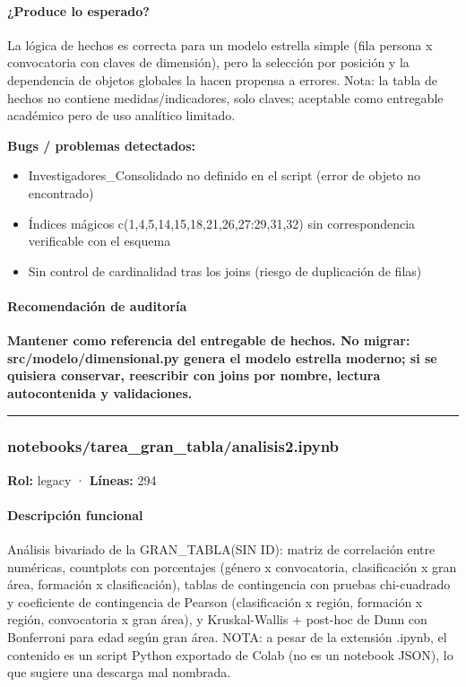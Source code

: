 \paragraph{¿Produce lo esperado?}
La lógica de hechos es correcta para un modelo estrella simple (fila persona x convocatoria con claves de dimensión), pero la selección por posición y la dependencia de objetos globales la hacen propensa a errores. Nota: la tabla de hechos no contiene medidas/indicadores, solo claves; aceptable como entregable académico pero de uso analítico limitado.

\begin{tcolorbox}[riesgo]
\textbf{Bugs / problemas detectados:}
\begin{itemize}
  \item Investigadores\_Consolidado no definido en el script (error de objeto no encontrado)
  \item Índices mágicos c(1,4,5,14,15,18,21,26,27:29,31,32) sin correspondencia verificable con el esquema
  \item Sin control de cardinalidad tras los joins (riesgo de duplicación de filas)
\end{itemize}
\end{tcolorbox}

\paragraph{Recomendación de auditoría}
\textbf{Mantener como referencia del entregable de hechos. No migrar: src/modelo/dimensional.py genera el modelo estrella moderno; si se quisiera conservar, reescribir con joins por nombre, lectura autocontenida y validaciones.}

\medskip
\hrule

\subsubsection{notebooks/tarea\_gran\_tabla/analisis2.ipynb}
\textbf{Rol:} legacy · \textbf{Líneas:} 294

\paragraph{Descripción funcional}
Análisis bivariado de la GRAN\_TABLA(SIN ID): matriz de correlación entre numéricas, countplots con porcentajes (género x convocatoria, clasificación x gran área, formación x clasificación), tablas de contingencia con pruebas chi-cuadrado y coeficiente de contingencia de Pearson (clasificación x región, formación x región, convocatoria x gran área), y Kruskal-Wallis + post-hoc de Dunn con Bonferroni para edad según gran área. NOTA: a pesar de la extensión .ipynb, el contenido es un script Python exportado de Colab (no es un notebook JSON), lo que sugiere una descarga mal nombrada.

